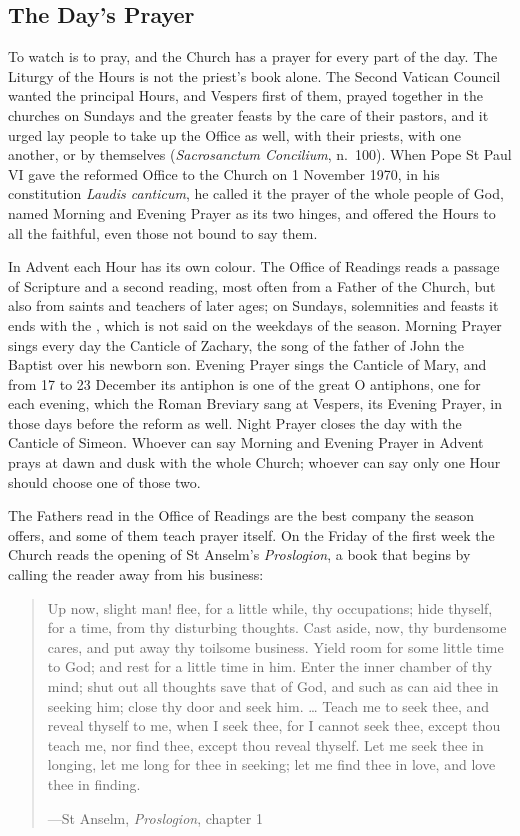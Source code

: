 \subsection{The Day's Prayer}\label{sec:prayer}

To watch is to pray, and the Church has a prayer for every part of the day. The
Liturgy of the Hours is not the priest's book alone. The Second Vatican Council
wanted the principal Hours, and Vespers first of them, prayed together in the
churches on Sundays and the greater feasts by the care of their pastors, and it
urged lay people to take up the Office as well, with their priests, with one
another, or by themselves (\emph{Sacrosanctum Concilium}, n.~100). When Pope
St Paul VI gave the reformed Office to the Church on 1 November 1970, in his
constitution \emph{Laudis canticum}, he called it the prayer of the whole people
of God, named Morning and Evening Prayer as its two hinges, and offered the
Hours to all the faithful, even those not bound to say them.

In Advent each Hour has its own colour. The Office of Readings reads a passage
of Scripture and a second reading, most often from a Father of the Church, but
also from saints and teachers of later ages; on Sundays, solemnities and feasts
it ends with the , which is not said on the weekdays of the
season. Morning Prayer
sings every day the Canticle of Zachary, the song of the father of John the
Baptist over his newborn son. Evening Prayer sings the Canticle of Mary, and
from 17 to 23 December its antiphon is one of the great O antiphons, one for
each evening, which the Roman Breviary sang at Vespers, its Evening Prayer, in
those days before the reform as well. Night Prayer closes the day with the Canticle of
Simeon. Whoever can say Morning and Evening
Prayer in Advent prays at dawn and dusk with the whole Church; whoever can say
only one Hour should choose one of those two.

The Fathers read in the Office of Readings are the best company the season
offers, and some of them teach prayer itself. On the Friday of the first week
the Church reads the opening of St Anselm's \emph{Proslogion}, a book that
begins by calling the reader away from his business:

\begin{quote}
Up now, slight man! flee, for a little while, thy occupations; hide thyself, for
a time, from thy disturbing thoughts. Cast aside, now, thy burdensome cares, and
put away thy toilsome business. Yield room for some little time to God; and rest
for a little time in him. Enter the inner chamber of thy mind; shut out all
thoughts save that of God, and such as can aid thee in seeking him; close thy
door and seek him. \ldots{} Teach me to seek thee, and reveal thyself to me,
when I seek thee, for I cannot seek thee, except thou teach me, nor find thee,
except thou reveal thyself. Let me seek thee in longing, let me long for thee in
seeking; let me find thee in love, and love thee in finding.\par
{\smallskip\noindent\small ---St Anselm, \emph{Proslogion}, chapter 1\par}
\end{quote}

